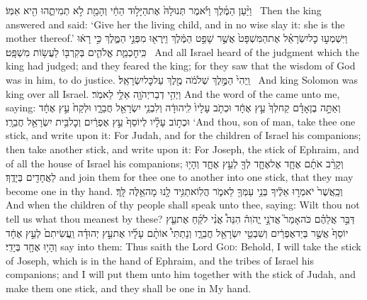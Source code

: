 {וַיַּ֨עַן הַמֶּ֜לֶךְ וַיֹּ֗אמֶר תְּנוּ\maqqaf לָהּ֙ אֶת\maqqaf הַיָּל֣וּד הַחַ֔י וְהָמֵ֖ת לֹ֣א תְמִיתֻ֑הוּ הִ֖יא אִמּֽוֹ׃ \setuma }
{Then the king answered and said: ‘Give her the living child, and in no wise slay it: she is the mother thereof.’}
{וַיִּשְׁמְע֣וּ כׇל\maqqaf יִשְׂרָאֵ֗ל אֶת\maqqaf הַמִּשְׁפָּט֙ אֲשֶׁ֣ר שָׁפַ֣ט הַמֶּ֔לֶךְ וַיִּֽרְא֖וּ מִפְּנֵ֣י הַמֶּ֑לֶךְ כִּ֣י רָא֔וּ כִּֽי\maqqaf חׇכְמַ֧ת אֱלֹהִ֛ים בְּקִרְבּ֖וֹ לַעֲשׂ֥וֹת מִשְׁפָּֽט׃ \setuma }
{And all Israel heard of the judgment which the king had judged; and they feared the king; for they saw that the wisdom of God was in him, to do justice.}
\newperek
{}
{וַֽיְהִי֙ הַמֶּ֣לֶךְ שְׁלֹמֹ֔ה מֶ֖לֶךְ עַל\maqqaf כׇּל\maqqaf יִשְׂרָאֵֽל׃ \setuma }
{And king Solomon was king over all Israel.}
\newperek
{}
\label{haft_11}
\setcounter{chap}{37}
\setcounter{verse}{15}
{וַיְהִ֥י דְבַר\maqqaf יְהֹוָ֖ה אֵלַ֥י לֵאמֹֽר׃}
{And the word of the \lord\space came unto me, saying:}
{וְאַתָּ֣ה בֶן\maqqaf אָדָ֗ם קַח\maqqaf לְךָ֙ עֵ֣ץ אֶחָ֔ד וּכְתֹ֤ב עָלָיו֙ לִֽיהוּדָ֔ה וְלִבְנֵ֥י יִשְׂרָאֵ֖ל חֲבֵרָ֑ו וּלְקַח֙ עֵ֣ץ אֶחָ֔ד וּכְת֣וֹב עָלָ֗יו לְיוֹסֵף֙ עֵ֣ץ אֶפְרַ֔יִם וְכׇל\maqqaf בֵּ֥ית יִשְׂרָאֵ֖ל חֲבֵרָֽו׃}
{‘And thou, son of man, take thee one stick, and write upon it: For Judah, and for the children of Israel his companions; then take another stick, and write upon it: For Joseph, the stick of Ephraim, and of all the house of Israel his companions;}
{וְקָרַ֨ב אֹתָ֜ם אֶחָ֧ד אֶל\maqqaf אֶחָ֛ד לְךָ֖ לְעֵ֣ץ אֶחָ֑ד וְהָי֥וּ לַאֲחָדִ֖ים בְּיָדֶֽךָ׃}
{and join them for thee one to another into one stick, that they may become one in thy hand.}
{וְכַֽאֲשֶׁר֙ יֹאמְר֣וּ אֵלֶ֔יךָ בְּנֵ֥י עַמְּךָ֖ לֵאמֹ֑ר הֲלֽוֹא\maqqaf תַגִּ֥יד לָ֖נוּ מָה\maqqaf אֵ֥לֶּה לָּֽךְ׃}
{And when the children of thy people shall speak unto thee, saying: Wilt thou not tell us what thou meanest by these?}
{דַּבֵּ֣ר אֲלֵהֶ֗ם כֹּה\maqqaf אָמַר֮ אֲדֹנָ֣י יֱהֹוִה֒ הִנֵּה֩ אֲנִ֨י לֹקֵ֜חַ אֶת\maqqaf עֵ֤ץ יוֹסֵף֙ אֲשֶׁ֣ר בְּיַד\maqqaf אֶפְרַ֔יִם וְשִׁבְטֵ֥י יִשְׂרָאֵ֖ל חֲבֵרָ֑ו וְנָתַתִּי֩ אוֹתָ֨ם עָלָ֜יו אֶת\maqqaf עֵ֣ץ יְהוּדָ֗ה וַֽעֲשִׂיתִם֙ לְעֵ֣ץ אֶחָ֔ד וְהָי֥וּ אֶחָ֖ד בְּיָדִֽי׃}
{say into them: Thus saith the Lord \textsc{God}: Behold, I will take the stick of Joseph, which is in the hand of Ephraim, and the tribes of Israel his companions; and I will put them unto him together with the stick of Judah, and make them one stick, and they shall be one in My hand.}
